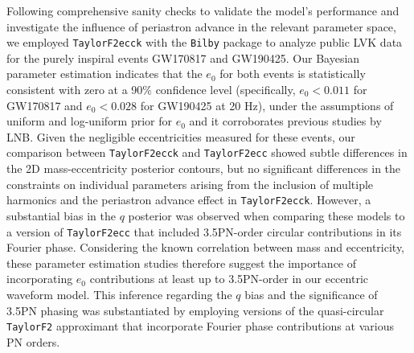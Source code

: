 \documentclass[aps,prd,twocolumn,superscriptaddress,groupedaddress,nofootinbib,showpacs,eqsecnum,useAms]{revtex4-2}
\begin{document}
Following comprehensive sanity checks to validate the model's performance and investigate the influence of  periastron advance in the relevant parameter space, we employed \texttt{TaylorF2ecck} with the \texttt{Bilby} package to analyze public LVK data for the purely inspiral events GW170817 and GW190425.
Our Bayesian parameter estimation indicates that the $e_0$ for both events is statistically consistent with zero at a 90\% confidence level (specifically, $e_0 < 0.011$ for GW170817 and $e_0 < 0.028$ for GW190425 at 20 Hz), under the assumptions of  uniform and log-uniform prior for $e_0$ and it corroborates previous studies by LNB.
Given the negligible eccentricities measured for these events, our comparison between \texttt{TaylorF2ecck} and \texttt{TaylorF2ecc} showed subtle differences in the 2D mass-eccentricity posterior contours, but no significant differences in the constraints on individual parameters arising from the inclusion of multiple harmonics and the periastron advance effect in \texttt{TaylorF2ecck}. However, a substantial bias in the $q$ posterior was observed when comparing these models to a version of \texttt{TaylorF2ecc} that included 3.5PN-order circular contributions in its Fourier phase. Considering the known correlation between mass and eccentricity, these parameter estimation studies therefore suggest the importance of incorporating $e_0$ contributions at least up to 3.5PN-order in our eccentric waveform model. This inference regarding the $q$ bias and the significance of 3.5PN phasing was substantiated by employing versions of the quasi-circular \texttt{TaylorF2} approximant that incorporate Fourier phase contributions at various PN orders.

\end{document}
